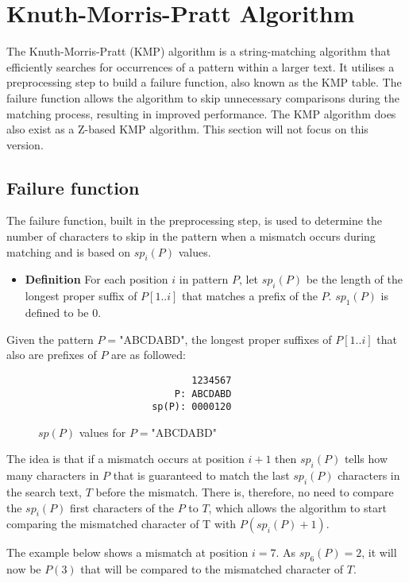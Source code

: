 
\section{Knuth-Morris-Pratt Algorithm}
The Knuth-Morris-Pratt (KMP) algorithm is a string-matching algorithm that efficiently searches for occurrences of a pattern within a larger text. It utilises a preprocessing step to build a failure function, also known as the KMP table. The failure function allows the algorithm to skip unnecessary comparisons during the matching process, resulting in improved performance. The KMP algorithm does also exist as a Z-based KMP algorithm. This section will not focus on this version.

\subsection{Failure function}
The failure function, built in the preprocessing step, is used to determine the number of characters to skip in the pattern when a mismatch occurs during matching and is based on $sp_i(P)$ values.

\begin{itemize}
    \item[] \textbf{Definition} For each position $i$ in pattern $P$, let $sp_i(P)$ be the length of the longest proper suffix of $P[1..i]$ that matches a prefix of the $P$. $sp_1(P)$ is defined to be 0.
\end{itemize}

Given the pattern $P=$"ABCDABD", the longest proper suffixes of $P[1..i]$ that also are prefixes of $P$ are as followed:

\begin{figure}[H]
\begin{verbatim}
                           1234567
                        P: ABCDABD
                    sp(P): 0000120
\end{verbatim}
\caption{$sp(P)$ values for  $P=$"ABCDABD"}
\label{fig:spP}
\end{figure}
The idea is that if a mismatch occurs at position $i+1$ then $sp_{i}(P)$ tells how many characters in $P$ that is guaranteed to match the last $sp_i(P)$ characters in the search text, $T$ before the mismatch. There is, therefore, no need to compare the  $sp_i(P)$ first characters of the $P$ to $T$, which allows the algorithm to start comparing the mismatched character of T with $P(sp_i(P)+1)$.

The example below shows a mismatch at position $i=7$. As $sp_{6}(P) = 2$, it will now be $P(3)$ that will be compared to the mismatched character of $T$. 

